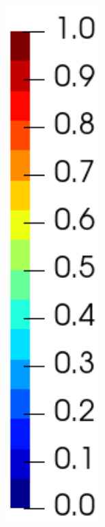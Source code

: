 \begin{figure}[!htb]
\begin{subfigure}[b]{0.1\textwidth}
    \includegraphics[width=0.4\textwidth]{Chapter5/figures/spallation/colorbar_gc}
    \vspace{3em}
  \end{subfigure}
  

\end{figure}
